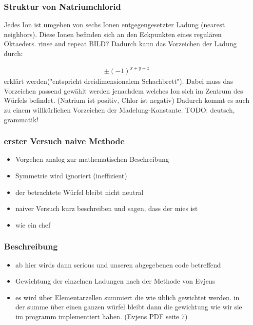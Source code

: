 \documentclass[10pt,a4paper]{article}
\begin{document}
\subsubsection{Struktur von Natriumchlorid}

Jedes Ion ist umgeben von sechs Ionen entgegengesetzter Ladung (nearest neighbors). Diese Ionen befinden sich an den Eckpunkten eines 
regulären Oktaeders. rinse and repeat BILD? Dadurch kann das Vorzeichen der Ladung durch:

\begin{align}
\pm \left( -1 \right)^{x+y+z}
\end{align}
erklärt werden("entspricht dreidimensionalem Schachbrett"). Dabei muss das Vorzeichen passend gewählt werden jenachdem welches Ion sich im Zentrum des
Würfels befindet. (Natrium ist positiv, Chlor ist negativ) Dadurch kommt es auch zu einem willkürlichen Vorzeichen
der Madelung-Konstante. TODO: deutsch, grammatik!

\subsubsection{erster Versuch naive Methode}

\begin{itemize}
\item Vorgehen analog zur mathematischen Beschreibung
\item Symmetrie wird ignoriert (ineffizient)
\item der betrachtete Würfel bleibt nicht neutral
\item naiver Versuch kurz beschreiben und sagen, dass der mies ist
\item wie ein chef
\end{itemize}

\subsubsection{Beschreibung}

\begin{itemize}
\item ab hier wirds dann serious und unseren abgegebenen code betreffend
\item Gewichtung der einzelnen Ladungen nach der Methode von Evjens\cite{Evjen}
\item es wird über Elementarzellen summiert die wie üblich gewichtet werden. in der summe über einen ganzen würfel bleibt dann die gewichtung wie wir sie im programm implementiert haben. (Evjens PDF seite 7)
\end{itemize}
\end{document}
